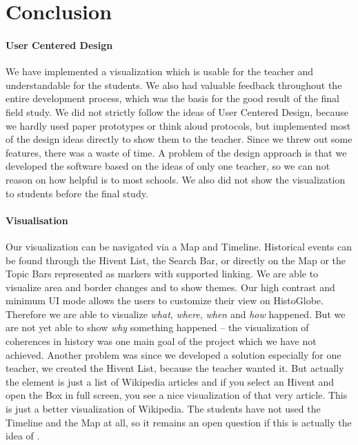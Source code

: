 \section{Conclusion} %
\label{sec:conclusion}

\paragraph{User Centered Design} %
We have implemented a visualization which is usable for the teacher and understandable for the students. We also had valuable feedback throughout the entire development process, which was the basis for the good result of the final field study. We did not strictly follow the ideas of User Centered Design, because we hardly used paper prototypes or think aloud protocols, but implemented most of the design ideas directly to show them to the teacher. Since we threw out some features, there was a waste of time. A problem of the design approach is that we developed the software based on the ideas of only one teacher, so we can not reason on how helpful \HG is to most schools. We also did not show the visualization to students before the final study.

\paragraph{Visualisation} %
Our visualization can be navigated via a Map and Timeline. Historical events can be found through the Hivent List, the Search Bar, or directly on the Map or the Topic Bars represented as markers with supported linking. We are able to visualize area and border changes and to show themes. Our high contrast and minimum UI mode allows the users to customize their view on HistoGlobe. Therefore we are able to visualize \textit{what}, \textit{where}, \textit{when} and \textit{how} happened. But we are not yet able to show \textit{why} something happened -- the visualization of coherences in history was one main goal of the project which we have not achieved. Another problem was since we developed a solution especially for one teacher, we created the Hivent List, because the teacher wanted it. But actually the element is just a list of Wikipedia articles and if you select an Hivent and open the Box in full screen, you see a nice visualization of that very article. This is just a better visualization of Wikipedia. The students have not used the Timeline and the Map at all, so it remains an open question if this is actually the idea of \HG.

